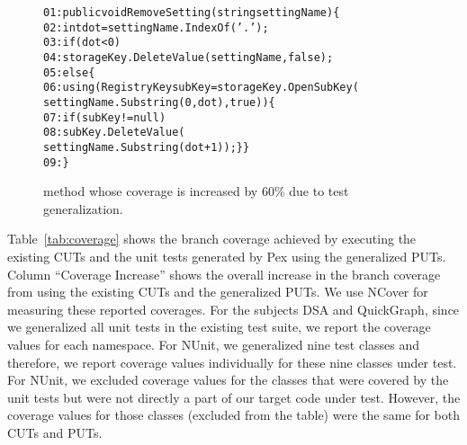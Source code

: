 \begin{figure}[t]
\begin{CodeOut}
\begin{alltt}
01: public void RemoveSetting( string settingName) \{
02: \hspace*{0.05in}int dot = settingName.IndexOf( '.' );
03: \hspace*{0.15in}if ( dot < 0 )
04: \hspace*{0.2in}storageKey.DeleteValue( settingName, false );
05: \hspace*{0.15in}else \{
06: \hspace*{0.2in}using(RegistryKey subKey=storageKey.OpenSubKey(
\hspace*{0.8in}settingName.Substring(0,dot),true))\{
07: \hspace*{0.3in}if ( subKey != null )
08: \hspace*{0.5in}subKey.DeleteValue(
\hspace*{1.0in}settingName.Substring(dot + 1)); \} \}
09: \hspace*{0.02in}\} 
\end{alltt}
\end{CodeOut} \vspace*{-3ex}
\caption{ method whose coverage is increased by $60\%$ due to test generalization.} %
\label{fig:excoverage}
\end{figure}

Table~\ref{tab:coverage} shows the branch coverage achieved by executing the existing CUTs and the unit tests generated by Pex using the generalized PUTs. Column ``Coverage Increase'' shows the overall increase in the branch coverage from using the existing CUTs and the generalized PUTs. We use NCover for measuring these reported coverages. For the subjects DSA and QuickGraph, since we generalized all unit tests in the existing test suite, we report the coverage values for each namespace. For NUnit, we generalized nine test classes and therefore, we report coverage values individually for these nine classes under test. For NUnit, we excluded coverage values for the classes that were covered by the unit tests but were not directly a part of our target code under test. However, the coverage values for those classes (excluded from the table) were the same for both CUTs and PUTs.  


